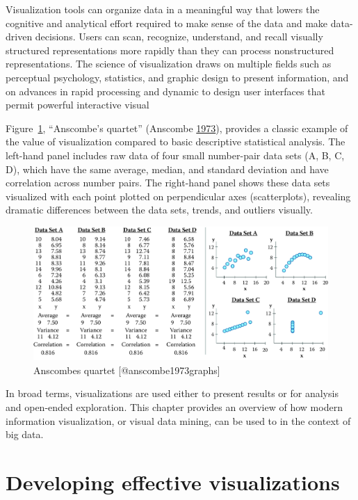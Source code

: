 \documentclass[]{krantz}
\begin{document}
Visualization tools can organize data in a meaningful way that lowers
the cognitive and analytical effort required to make sense of the data
and make data-driven decisions. Users can scan, recognize, understand,
and recall visually structured representations more rapidly than they
can process nonstructured representations. The science of visualization
draws on multiple fields such as perceptual psychology, statistics, and
graphic design to present information, and on advances in rapid
processing and dynamic to design user interfaces that permit powerful
interactive visual

Figure~\ref{fig:fig9-1}, ``Anscombe's quartet'' (Anscombe
\protect\hyperlink{ref-anscombe1973graphs}{1973}), provides a classic
example of the value of visualization compared to basic descriptive
statistical analysis. The left-hand panel includes raw data of four
small number-pair data sets (A, B, C, D), which have the same average,
median, and standard deviation and have correlation across number pairs.
The right-hand panel shows these data sets visualized with each point
plotted on perpendicular axes (scatterplots), revealing dramatic
differences between the data sets, trends, and outliers visually.

\begin{figure}

{\centering \includegraphics[width=0.7\linewidth]{ChapterViz/figures/fig9-1} 

}

\caption{Anscombes quartet [@anscombe1973graphs]}\label{fig:fig9-1}
\end{figure}

In broad terms, visualizations are used either to present results or for
analysis and open-ended exploration. This chapter provides an overview
of how modern information visualization, or visual data mining, can be
used to in the context of big data.

\section{Developing effective visualizations}\label{sec:viz-2}
\end{document}
